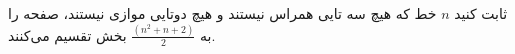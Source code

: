 \begin{PROBLEM}
	\p
	ثابت کنید 
	$n$
	خط که هیچ سه تایی همراس نیستند و هیچ دوتایی موازی نیستند، صفحه را به 
	$\frac{(n^2 + n + 2)}{2}$
	بخش تقسیم می‌کنند.
	\SOLUTION{
		\p
		
	}
\end{PROBLEM}